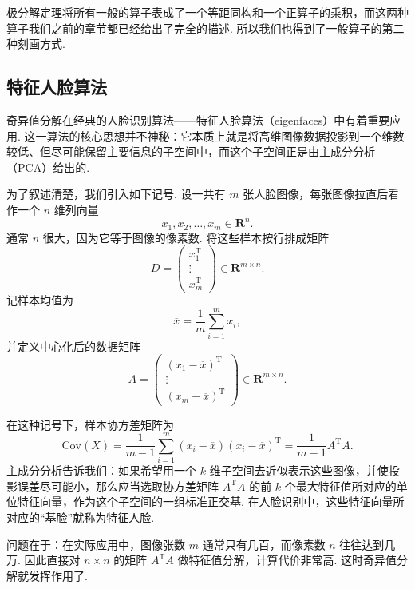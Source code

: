 极分解定理将所有一般的算子表成了一个等距同构和一个正算子的乘积，而这两种算子我们之前的章节都已经给出了完全的描述. 所以我们也得到了一般算子的第二种刻画方式.

\subsection{特征人脸算法}

奇异值分解在经典的人脸识别算法——特征人脸算法（eigenfaces）中有着重要应用. 这一算法的核心思想并不神秘：它本质上就是将高维图像数据投影到一个维数较低、但尽可能保留主要信息的子空间中，而这个子空间正是由主成分分析（PCA）给出的.

为了叙述清楚，我们引入如下记号. 设一共有 $ m $ 张人脸图像，每张图像拉直后看作一个 $ n $ 维列向量
\[
    x_1, x_2, \ldots, x_m \in \mathbf{R}^n.
\]
通常 $ n $ 很大，因为它等于图像的像素数. 将这些样本按行排成矩阵
\[
    D =
    \begin{pmatrix}
        x_1^{\mathrm{T}} \\
        \vdots           \\
        x_m^{\mathrm{T}}
    \end{pmatrix}
    \in \mathbf{R}^{m \times n}.
\]
记样本均值为
\[
    \overline{x} = \frac{1}{m}\sum_{i=1}^m x_i,
\]
并定义中心化后的数据矩阵
\[
    A =
    \begin{pmatrix}
        (x_1-\overline{x})^{\mathrm{T}} \\
        \vdots                          \\
        (x_m-\overline{x})^{\mathrm{T}}
    \end{pmatrix}
    \in \mathbf{R}^{m \times n}.
\]

在这种记号下，样本协方差矩阵为
\[
    \mathrm{Cov}(X)
    = \frac{1}{m-1}\sum_{i=1}^m (x_i-\overline{x})(x_i-\overline{x})^{\mathrm{T}}
    = \frac{1}{m-1}A^{\mathrm{T}}A.
\]
主成分分析告诉我们：如果希望用一个 $ k $ 维子空间去近似表示这些图像，并使投影误差尽可能小，那么应当选取协方差矩阵 $ A^{\mathrm{T}}A $ 的前 $ k $ 个最大特征值所对应的单位特征向量，作为这个子空间的一组标准正交基. 在人脸识别中，这些特征向量所对应的“基脸”就称为特征人脸.

问题在于：在实际应用中，图像张数 $ m $ 通常只有几百，而像素数 $ n $ 往往达到几万. 因此直接对 $ n \times n $ 的矩阵 $ A^{\mathrm{T}}A $ 做特征值分解，计算代价非常高. 这时奇异值分解就发挥作用了.

